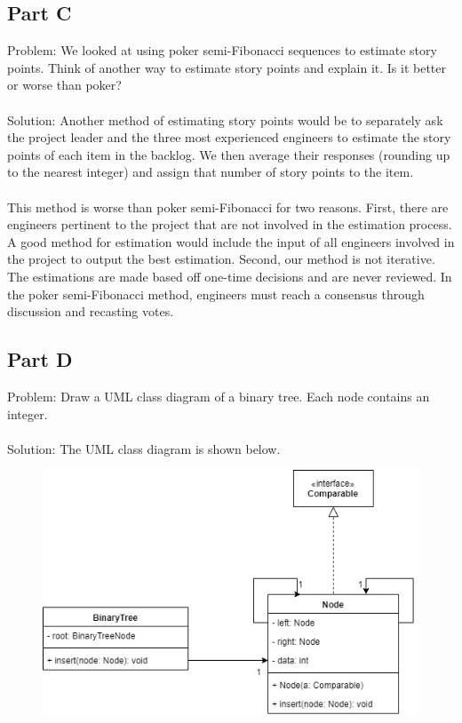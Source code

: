 \documentclass{article}
\begin{document}
\subsection*{Part C}
Problem: We looked at using poker semi-Fibonacci sequences to estimate story points. Think of another way to estimate story points and explain it. Is it better or worse than poker? \\\\
Solution: Another method of estimating story points would be to separately ask the project leader and the three most experienced engineers to estimate the story points of each item in the backlog. We then average their responses (rounding up to the nearest integer) and assign that number of story points to the item. \\\\
This method is worse than poker semi-Fibonacci for two reasons.
First, there are engineers pertinent to the project that are not involved in the estimation process. A good method for estimation would include the input of all engineers involved in the project to output the best estimation.
Second, our method is not iterative. The estimations are made based off one-time decisions and are never reviewed. In the poker semi-Fibonacci method, engineers must reach a consensus through discussion and recasting votes.

\subsection*{Part D}
Problem: Draw a UML class diagram of a binary tree. Each node contains an integer. \\\\
Solution: The UML class diagram is shown below.
\begin{figure}[h]
	\centering
	\includegraphics[width=5in]{hw3-binary-tree.jpg}
\end{figure}
\end{document}
